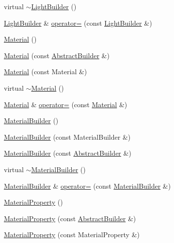 \begin{DoxyCompactItemize}
virtual \hyperlink{namespacejli_a82b7beb28538effa192372c918468b1d}{$\sim$\+Light\+Builder} ()
\item 
\hyperlink{namespacejli_ab74bc38edd1ef6ffefa07b38a456dbf4}{Light\+Builder} \& \hyperlink{namespacejli_a45c9337ab49b0aacc1d8064bb940a7f7}{operator=} (const \hyperlink{namespacejli_ab74bc38edd1ef6ffefa07b38a456dbf4}{Light\+Builder} \&)
\item 
\hyperlink{namespacejli_a007372827318c5314719b1f97041f45c}{Material} ()
\item 
\hyperlink{namespacejli_a60fe526f7e6659ff8ae5f9cae7fb4c10}{Material} (const \hyperlink{classjli_1_1_abstract_builder}{Abstract\+Builder} \&)
\item 
\hyperlink{namespacejli_a2a281e85f9e15afd7c78051b8be24bb6}{Material} (const Material \&)
\item 
virtual \hyperlink{namespacejli_aeb5589dfed522420ea6a33236bde9a6b}{$\sim$\+Material} ()
\item 
\hyperlink{namespacejli_a007372827318c5314719b1f97041f45c}{Material} \& \hyperlink{namespacejli_ae9804996da5acf53e3b4b19831db4431}{operator=} (const \hyperlink{namespacejli_a007372827318c5314719b1f97041f45c}{Material} \&)
\item 
\hyperlink{namespacejli_abbc4482d10b2fab1145308318ec6ef4e}{Material\+Builder} ()
\item 
\hyperlink{namespacejli_ad3851357f4c908c0673c097c941828d6}{Material\+Builder} (const Material\+Builder \&)
\item 
\hyperlink{namespacejli_a8fb3dd20b46500cee7e4feb50df32824}{Material\+Builder} (const \hyperlink{classjli_1_1_abstract_builder}{Abstract\+Builder} \&)
\item 
virtual \hyperlink{namespacejli_aaf5dad0f1e903db02a6b170d69f35c37}{$\sim$\+Material\+Builder} ()
\item 
\hyperlink{namespacejli_abbc4482d10b2fab1145308318ec6ef4e}{Material\+Builder} \& \hyperlink{namespacejli_a786eb560b2617f0b8e9324d7d9cc9339}{operator=} (const \hyperlink{namespacejli_abbc4482d10b2fab1145308318ec6ef4e}{Material\+Builder} \&)
\item 
\hyperlink{namespacejli_aac4773f4081fe5e6116c6e85803b59e0}{Material\+Property} ()
\item 
\hyperlink{namespacejli_acba837966af210890b7418fc4926d2eb}{Material\+Property} (const \hyperlink{classjli_1_1_abstract_builder}{Abstract\+Builder} \&)
\item 
\hyperlink{namespacejli_afb1bbc3b06ceaaf5d288bdf3c615d1d7}{Material\+Property} (const Material\+Property \&)

\end{DoxyCompactItemize}
